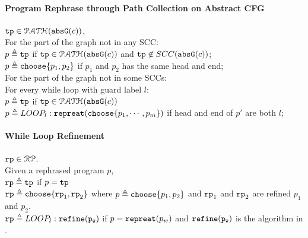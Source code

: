 \paragraph*{Program Rephrase through Path Collection on Abstract CFG}
$\mathtt{tp} \in \mathcal{PATH}(\mathtt{abs}{\mathtt{G}}(c))$, 
\\
For the part of the graph not in any SCC:
\\
$p \triangleq \mathtt{tp} $ if $\mathtt{tp} \in \mathcal{PATH}(\mathtt{abs}{\mathtt{G}}(c))$ and $\mathtt{tp} \not\in SCC(\mathtt{abs}{\mathtt{G}}(c))$;
\\
$p \triangleq \mathtt{choose}\{p_1, p_2 \}$ if $p_1$ and $p_2$ has the same head and end;
\\
For the part of the graph not in some SCCs:
\\
For every while loop with guard label $l$:
\\
$p \triangleq \mathtt{tp} $ if $\mathtt{tp} \in \mathcal{PATH}(\mathtt{abs}{\mathtt{G}}(c))$
\\
$p \triangleq LOOP_l : \mathtt{repreat}(\mathtt{choose}\{p_1, \cdots, p_m\})$ if head and end of $p'$ are both $l$;
%
\paragraph*{While Loop Refinement} $\mathtt{rp} \in \mathcal{RP}$.
\\
Given a rephrased program $p$, \\
$\mathtt{rp} \triangleq \mathtt{tp} $ if $p = \mathtt{tp}$\\
$\mathtt{rp} \triangleq \mathtt{choose}\{\mathtt{rp}_1, \mathtt{rp}_2 \}$ where $p \triangleq \mathtt{choose}\{p_1, p_2 \}$ and 
  $\mathtt{rp}_1$ and $\mathtt{rp}_2$ are refined $p_1$ and $p_2$. 
  \\
$\mathtt{rp} \triangleq LOOP_l : \mathtt{refine(p_w)}$  if $p = \mathtt{repreat}(p_w)$ and  $\mathtt{refine(p_w)}$ is the algorithm in \cite{sinn2017complexity}.

